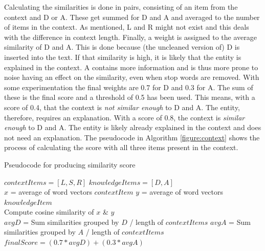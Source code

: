 \documentclass[
10pt, %
a4paper, %
oneside, %
headinclude,footinclude, %
] {book}%
\begin{document}
Calculating the similarities is done in pairs, consisting of an item from the context and D or A.
These get summed for D and A and averaged to the number of items in the context.
As mentioned, L and R might not exist and this deals with the difference in context length.
Finally, a weight is assigned to the average similarity of D and A.
This is done because (the uncleaned version of) D is inserted into the text.
If that similarity is high, it is likely that the entity is explained in the context.
A contains more information and is thus more prone to noise having an effect on the similarity, even when stop words are removed.
With some experimentation the final weights are 0.7 for D and 0.3 for A.
The sum of these is the final score and a threshold of 0.5 has been used.
This means, with a score of 0.4, that the context is \textit{not similar enough} to D and A.
The entity, therefore, requires an explanation.
With a score of 0.8, the context is \textit{similar enough} to D and A.
The entity is likely already explained in the context and does not need an explanation.
The pseudocode in Algorithm \ref{figure:context} shows the process of calculating the score with all three items present in the context.

\begin{algorithm}
  \caption{Pseudocode for producing similarity score\label{figure:context}}
  \begin{algorithmic}[1]
    \State $contextItems = [L, S, R]$
    \State $knowledgeItems = [D, A]$ \\

    \State $x$ = average of word vectors $contextItem$
    \State $y$ = average of word vectors $knowledgeItem$ \\

    \State Compute cosine similarity of $x$ \& $y$
    \EndFor
    \EndFor \\

    \State $avgD$ = Sum similarities grouped by $D$ / length of $contextItems$
    \State $avgA$ = Sum similarities grouped by $A$ / length of $contextItems$\\

    \State $finalScore = (0.7 * avgD) + (0.3 * avgA)$
  \end{algorithmic}
\end{algorithm}
\end{document}
